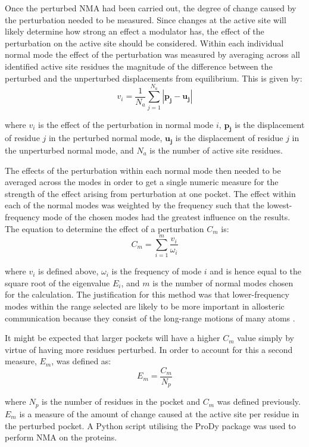 Once the perturbed NMA had been carried out, the degree of change caused by the perturbation needed to be measured.
Since changes at the active site will likely determine how strong an effect a modulator has, the effect of the perturbation on the active site should be considered.
Within each individual normal mode the effect of the perturbation was measured by averaging across all identified active site residues the magnitude of the difference between the perturbed and the unperturbed displacements from equilibrium.
This is given by:
$$
v_{i} = \frac{1}{N_{a}} \sum_{j=1}^{N_{a}} \left | \mathbf{p_{j}} - \mathbf{u_{j}} \right |
$$

where $v_{i}$ is the effect of the perturbation in normal mode $i$, $\mathbf{p_{j}}$ is the displacement of residue $j$ in the perturbed normal mode, $\mathbf{u_{j}}$ is the displacement of residue $j$ in the unperturbed normal mode, and $N_{a}$ is the number of active site residues.

The effects of the perturbation within each normal mode then needed to be averaged across the modes in order to get a single numeric measure for the strength of the effect arising from perturbation at one pocket.
The effect within each of the normal modes was weighted by the frequency such that the lowest-frequency mode of the chosen modes had the greatest influence on the results.
The equation to determine the effect of a perturbation $C_{m}$ is:
$$
C_{m} = \sum_{i=1}^{m} \frac{v_{i}}{\omega_{i}}
$$

where $v_{i}$ is defined above, $\omega_{i}$ is the frequency of mode $i$ and is hence equal to the square root of the eigenvalue $E_{i}$, and $m$ is the number of normal modes chosen for the calculation.
The justification for this method was that lower-frequency modes within the range selected are likely to be more important in allosteric communication because they consist of the long-range motions of many atoms \cite{Rodgers2013}.

It might be expected that larger pockets will have a higher $C_{m}$ value simply by virtue of having more residues perturbed.
In order to account for this a second measure, $E_{m}$, was defined as:
$$
E_{m} = \frac{C_{m}}{N_{p}}
$$

where $N_{p}$ is the number of residues in the pocket and $C_{m}$ was defined previously.
$E_{m}$ is a measure of the amount of change caused at the active site per residue in the perturbed pocket.
A Python script utilising the ProDy package \cite{Bakan2011} was used to perform NMA on the proteins.



